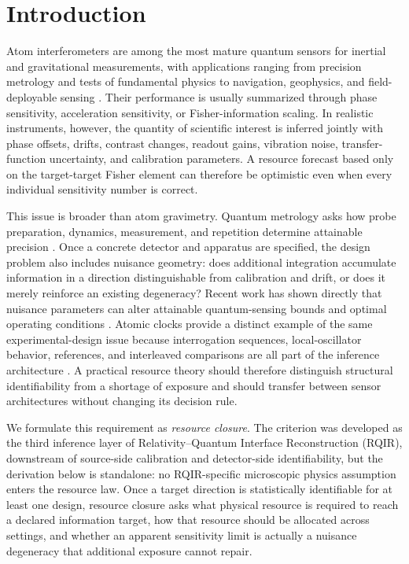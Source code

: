 \section{Introduction}
\label{sec:introduction}

Atom interferometers are among the most mature quantum sensors for inertial and gravitational measurements, with applications ranging from precision metrology and tests of fundamental physics to navigation, geophysics, and field-deployable sensing \cite{Bongs2019,Geiger2020}. Their performance is usually summarized through phase sensitivity, acceleration sensitivity, or Fisher-information scaling. In realistic instruments, however, the quantity of scientific interest is inferred jointly with phase offsets, drifts, contrast changes, readout gains, vibration noise, transfer-function uncertainty, and calibration parameters. A resource forecast based only on the target-target Fisher element can therefore be optimistic even when every individual sensitivity number is correct.

This issue is broader than atom gravimetry. Quantum metrology asks how probe preparation, dynamics, measurement, and repetition determine attainable precision \cite{Giovannetti2011,Pezze2018,Liu2020}. Once a concrete detector and apparatus are specified, the design problem also includes nuisance geometry: does additional integration accumulate information in a direction distinguishable from calibration and drift, or does it merely reinforce an existing degeneracy? Recent work has shown directly that nuisance parameters can alter attainable quantum-sensing bounds and optimal operating conditions \cite{Wani2026}. Atomic clocks provide a distinct example of the same experimental-design issue because interrogation sequences, local-oscillator behavior, references, and interleaved comparisons are all part of the inference architecture \cite{Ludlow2015,Lindvall2025}. A practical resource theory should therefore distinguish structural identifiability from a shortage of exposure and should transfer between sensor architectures without changing its decision rule.

We formulate this requirement as \emph{resource closure}. The criterion was developed as the third inference layer of Relativity--Quantum Interface Reconstruction (RQIR), downstream of source-side calibration and detector-side identifiability, but the derivation below is standalone: no RQIR-specific microscopic physics assumption enters the resource law. Once a target direction is statistically identifiable for at least one design, resource closure asks what physical resource is required to reach a declared information target, how that resource should be allocated across settings, and whether an apparent sensitivity limit is actually a nuisance degeneracy that additional exposure cannot repair.

